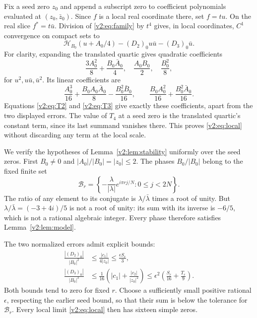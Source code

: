 \documentclass[UTF8,11pt]{ctexart}
\theoremstyle{definition}
\numberwithin{equation}{section}
\begin{document}
Fix a seed zero $z_0$ and append a subscript zero to coefficient
polynomials evaluated at $(z_0,\bar z_0)$. Since $f$ is a local real
coordinate there, set $f=tu$. On the real slice $f^*=t\bar u$.
Division of \eqref{v2:eq:family} by $t^4$ gives, in local coordinates,
$C^1$ convergence on compact sets to
\begin{equation}\label{v2:eq:local}
 \mathcal H_{B_0}(u+A_0/4)-(D_2)_0u\bar u-(D_3)_0\bar u.
\end{equation}
For clarity, expanding the translated quartic gives quadratic
coefficients
\[
 \frac{3A_0^2}{8}+\frac{B_0\bar A_0}{4},\quad
 \frac{A_0B_0}{2},\quad\frac{B_0^2}{8},
\]
for $u^2,u\bar u,\bar u^2$. Its linear coefficients are
\[
 \frac{A_0^3}{16}+\frac{B_0A_0\bar A_0}{8}
                      -\frac{B_0^2\bar B_0}{16},\qquad
 \frac{B_0A_0^2}{16}+\frac{B_0^2\bar A_0}{16}.
\]
Equations \eqref{v2:eq:T2} and \eqref{v2:eq:T3} give exactly these
coefficients, apart from the two displayed errors. The value of $T_4$
at a seed zero is the translated quartic's constant term, since its
last summand vanishes there. This proves \eqref{v2:eq:local} without
discarding any term at the local scale.

We verify the hypotheses of Lemma~\ref{v2:lem:stability} uniformly
over the seed zeros. First $B_0\ne0$ and
$|A_0|/|B_0|=|z_0|\le2$. The phases $B_0/|B_0|$ belong to the fixed
finite set
\[
 \mathcal B_r=\left\{-\frac{\lambda}{|\lambda|}
                    e^{i\pi rj/N}:0\le j<2N\right\}.
\]
The ratio of any element to its conjugate is $\lambda/\bar\lambda$
times a root of unity. But
$\lambda/\bar\lambda=(-3+4i)/5$ is not a root of unity: its sum
with its inverse is $-6/5$, which is not a rational algebraic integer.
Every phase therefore satisfies Lemma~\ref{v2:lem:model}.

The two normalized errors admit explicit bounds:
\begin{align}
 \frac{|(D_2)_0|}{|B_0|^2}
   &\le\frac{|c_1|}{4|z_0|}
     \le\frac{\epsilon S_r}{3},\label{v2:eq:error2}\\
 \frac{|(D_3)_0|}{|B_0|^3}
   &\le\frac1{16}\left(|c_1|+\frac{|c_2|}{|z_0|^2}\right)
     \le\epsilon^2\left(\frac{S_r}{16}+\frac{T_r}{9}\right).
     \label{v2:eq:error3}
\end{align}
Both bounds tend to zero for fixed $r$. Choose a sufficiently small
positive rational $\epsilon$, respecting the earlier seed bound, so
that their sum is below the tolerance for $\mathcal B_r$. Every
local limit \eqref{v2:eq:local} then has sixteen simple zeros.
\end{document}
